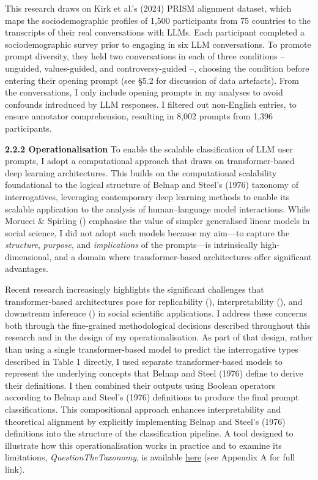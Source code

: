 \documentclass[
  12pt,
]{article}
\begin{document}
This research draws on Kirk et al.'s (2024) PRISM alignment dataset, which maps the sociodemographic profiles of 1,500 participants from 75 countries to the transcripts of their real conversations with LLMs. Each participant completed a sociodemographic survey prior to engaging in six LLM conversations. To promote prompt diversity, they held two conversations in each of three conditions -- unguided, values-guided, and controversy-guided --, choosing the condition before entering their opening prompt (see §5.2 for discussion of data artefacts). From the conversations, I only include opening prompts in my analyses to avoid confounds introduced by LLM responses. I filtered out non-English entries, to ensure annotator comprehension, resulting in 8,002 prompts from 1,396 participants.

\textbf{2.2.2 Operationalisation} To enable the scalable classification of LLM user prompts, I adopt a computational approach that draws on transformer-based deep learning architectures. This builds on the computational scalability foundational to the logical structure of Belnap and Steel's (1976) taxonomy of interrogatives, leveraging contemporary deep learning methods to enable its scalable application to the analysis of human--language model interactions. While Morucci \& Spirling () emphasise the value of simpler generalised linear models in social science, I did not adopt such models because my aim---to capture the \emph{structure}, \emph{purpose}, and \emph{implications} of the prompts---is intrinsically high-dimensional, and a domain where transformer-based architectures offer significant advantages.

Recent research increasingly highlights the significant challenges that transformer-based architectures pose for replicability (), interpretability (), and downstream inference () in social scientific applications. I address these concerns both through the fine-grained methodological decisions described throughout this research and in the design of my operationalisation. As part of that design, rather than using a single transformer-based model to predict the interrogative types described in Table 1 directly, I used separate transformer-based models to represent the underlying concepts that Belnap and Steel (1976) define to derive their definitions. I then combined their outputs using Boolean operators according to Belnap and Steel's (1976) definitions to produce the final prompt classifications. This compositional approach enhances interpretability and theoretical alignment by explicitly implementing Belnap and Steel's (1976) definitions into the structure of the classification pipeline. A tool designed to illustrate how this operationalisation works in practice and to examine its limitations, \emph{QuestionTheTaxonomy}, is available \href{https://huggingface.co/spaces/carowagner/questionthetaxonomy}{here} (see Appendix A for full link).
\end{document}
